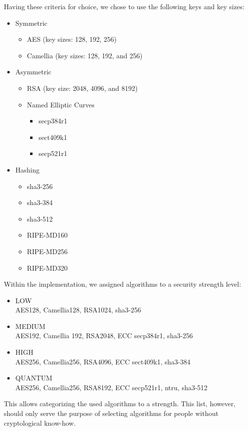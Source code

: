 Having these criteria for choice, we chose to use the following keys and key sizes:
\begin{itemize}
	\item Symmetric
	\begin{itemize}
		\item AES (key sizes: 128, 192, 256)
		\item Camellia (key sizes: 128, 192, and 256)
	\end{itemize}
	\item Asymmetric
	\begin{itemize}
		\item RSA (key size: 2048, 4096, and 8192)
		\item Named Elliptic Curves
		\begin{itemize}
			\item secp384r1
			\item sect409k1
			\item secp521r1
		\end{itemize}
	\end{itemize}
	\item Hashing
	\begin{itemize}
		\item sha3-256
		\item sha3-384
		\item sha3-512
		\item RIPE-MD160
		\item RIPE-MD256
		\item RIPE-MD320
	\end{itemize}
\end{itemize}

Within the implementation, we assigned algorithms to a security strength level:
\begin{itemize}
	\item LOW\\
	AES128, Camellia128, RSA1024, sha3-256
	\item MEDIUM\\
	AES192, Camellia 192, RSA2048, ECC secp384r1, sha3-256
	\item HIGH\\
	AES256, Camellia256, RSA4096, ECC sect409k1, sha3-384
	\item QUANTUM\\
	AES256, Camellia256, RSA8192, ECC secp521r1, ntru, sha3-512
\end{itemize}

This allows categorizing the used algorithms to a strength. This list, however, should only serve the purpose of selecting algorithms for people without cryptological know-how.

